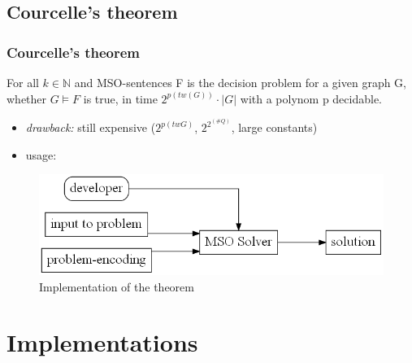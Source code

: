 \documentclass[c,8pt,xcolor...,x11names]{beamer}
\begin{document}
\subsection[Courcelle]{Courcelle's theorem}
\begin{frame}
	\frametitle{Courcelle's theorem}


	\medskip
	For all $k \in \mathbb{N}$ and MSO-sentences F is the decision problem for a given graph G, whether $G \models F$ is true, in time $2^{p(tw(G))} \cdot |G|$ with a polynom p decidable.
	\medskip
	\begin{itemize}

		\item \emph{drawback:} still expensive ($2^{p(tw G)}$, $2^{2^{(\#Q)}}$, large constants) \smallskip 
		\item usage:

	\end{itemize}
	\begin{figure}
		\includegraphics[height=0.2\textheight]{images/UsageCourcelle.gv.png}
		\caption{Implementation of the theorem}
	\end{figure}
\end{frame}


\section{Implementations}
\end{document}
